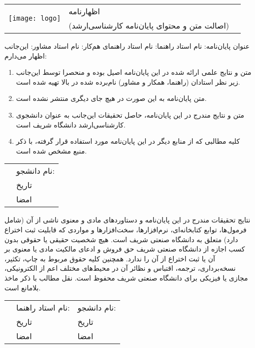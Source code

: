\thispagestyle{empty}
\begin{tabular}{m{} m{} m{}}
\multirow{2}{*}{\texttt{[image: logo]}}
 & 
\centering \Large{اظهارنامه} \normalsize & \\
 & \centering \large{(اصالت متن و محتوای پایان‌نامه کارشناسی‌ارشد)}   &  \\
\end{tabular}
\newline
\vspace{2cm}
\newline
عنوان پایان‌نامه:
\fatitle{}
\newline
\vspace{0.2cm}
\newline
نام استاد راهنما: 
\fasupervisor{} \hspace{.5cm}
نام استاد راهنمای هم‌کار: 
\fahamkar{} \hspace{.5cm}
نام استاد مشاور: 
\famoshaver{}
\newline\newline
این‌جانب 
\faAuthor{}
 اظهار می‌دارم:
\begin{enumerate}
\item
متن و نتایج علمی ارائه شده در این پایان‌نامه اصیل بوده و منحصرا توسط این‌جانب زیر نظر استادان (راهنما، همکار و مشاور) نام‌برده شده در بالا تهیه شده است.
\item
متن پایان‌نامه به این صورت در هیچ جای دیگری منتشر نشده است.
\item
متن و نتایج مندرج در این پایان‌نامه، حاصل تحقیقات این‌جانب به عنوان دانشجوی کارشناسی‌ارشد دانشگاه شریف است.
\item
کلیه مطالبی که از منابع دیگر در این پایان‌نامه مورد استفاده قرار گرفته، با ذکر منبع مشخص شده است.
\end{enumerate}
\begin{tabular}{m{} m{}}
	&
نام دانشجو: 	
\hspace{0.1cm} \faAuthor{}
\\ & 
تاریخ
\\ & 
امضا
\\
\end{tabular}
\newline\newline\newline\newline
نتایج تحقیقات مندرج در این پایان‌نامه و دستاوردهای مادی و معنوی ناشی از آن (شامل فرمول‌ها، توابع کتابخانه‌ای، نرم‌افزارها، سخت‌افزارها و مواردی که قابلیت ثبت اختراع دارد) متعلق به دانشگاه صنعتی شریف است. هیچ شخصیت حقیقی یا حقوقی بدون کسب اجازه از دانشگاه صنعتی شریف حق فروش و ادعای مالکیت مادی یا معنوی بر آن یا ثبت اختراع از آن را ندارد. همچنین کلیه حقوق مربوط به چاپ، تکثیر، نسخه‌برداری، ترجمه، اقتباس و نظائر آن در محیط‌های مختلف اعم از الکترونیکی، مجازی یا فیزیکی برای دانشگاه صنعتی شریف محفوظ است. نقل مطالب  با ذکر ماخذ بلامانع است.
\newline\newline
\begin{tabular}{m{} m{} m{}}
	&
	نام استاد راهنما: 
	\hspace{0.1cm} \fasupervisor{}
	&
	نام دانشجو: 	
	\hspace{0.1cm} \faAuthor{}
	\\
	&
	تاریخ
	& 
	تاریخ
	\\
	&
	امضا
	&
	امضا
	\\
\end{tabular}